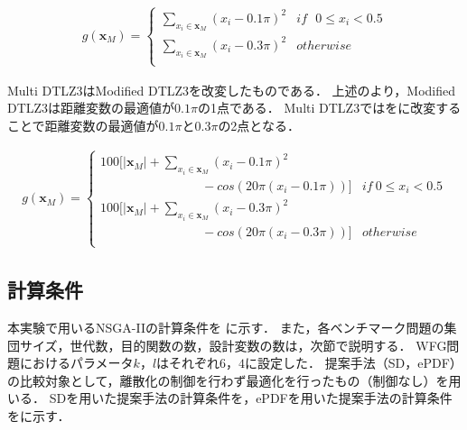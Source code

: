 \documentclass[../main/main]{subfiles}
\begin{document}
\begin{eqnarray}
g(\bm x_M) = 
\left\{
\begin{array}{rl}
\sum_{x_i \in \bm x_M} (x_i - 0.1 \pi)^2 & if  \ \ \  0 \leq x_i < 0.5\\
\sum_{x_i \in \bm x_M} (x_i - 0.3 \pi)^2 & otherwise \\
\end{array}
\right.
\label{gx_multi2}
\end{eqnarray}


Multi DTLZ3はModified DTLZ3を改変したものである．
上述のより，Modified DTLZ3は距離変数の最適値が$0.1\pi$の1点である．
Multi DTLZ3ではをに改変することで距離変数の最適値が$0.1\pi$と$0.3\pi$の2点となる．

\begin{eqnarray}
g(\bm x_M) = 
\left\{
\begin{array}{ll}
100[|\bm x_M| + \sum_{x_i \in \bm x_M} (x_i - 0.1\pi)^2 &\\
\qquad \qquad \qquad \qquad - cos(20 \pi (x_i - 0.1 \pi ))] & if  \  0 \leq x_i < 0.5 \\
100[|\bm x_M| + \sum_{x_i \in \bm x_M} (x_i - 0.3\pi)^2 &\\
\qquad \qquad \qquad \qquad - cos(20 \pi (x_i - 0.3 \pi ))] & otherwise \\
\end{array}
\right.
\label{gx_multi3}
\end{eqnarray}

\afterpage{\clearpage}



\subsection{計算条件}
本実験で用いるNSGA-IIの計算条件を  に示す．
また，各ベンチマーク問題の集団サイズ，世代数，目的関数の数，設計変数の数は，次節で説明する．
WFG問題におけるパラメータ$k$，$l$はそれぞれ$6$，$4$に設定した．
提案手法（SD，ePDF）の比較対象として，離散化の制御を行わず最適化を行ったもの（制御なし）を用いる．
SDを用いた提案手法の計算条件を，ePDFを用いた提案手法の計算条件をに示す．
\end{document}
